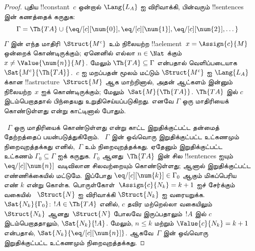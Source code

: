 \documentclass[../../../include/open-logic-section]{subfiles}
\begin{document}
\begin{proof}
புதிய !!{constant}~$c$ ஒன்றால் $\Lang{L_A}$ ஐ விரிவாக்கி,
பின்வரும் !!{sentence}s இன் கணத்தைக் கருதுக:
\[
\Gamma = \Th{TA} \cup \{\eq/[c][\num{0}], \eq/[c][\num{1}],
\eq/[c][\num{2}], \dots\}
\]
$\Gamma$ இன் எந்த மாதிரி~$\Struct{M^c}$ உம் நிலையற்ற
!!a{element}~$x =
\Assign{c}{M}$ ஒன்றைக் கொண்டிருக்கும்; ஏனெனில் எல்லா
$n \in \Nat$ க்கும் $x \neq
\Value{\num{n}}{M}$. மேலும் $\Th{TA} \subseteq \Gamma$ என்பதால்
வெளிப்படையாக $\Sat{M^c}{\Th{TA}}$.~$c$ ஐ மறப்பதன் மூலம் மட்டும்
$\Struct{M^c}$ ஐ $\Lang{L_A}$ க்கான !!a{structure}~$\Struct{M}$
ஆக மாற்றினால், அதன் ஆட்களம் இன்னும் நிலையற்ற~$x$ ஐக் கொண்டிருக்கும்;
மேலும்~$\Sat{M}{\Th{TA}}$. $\Th{TA}$ இல் $c$ இடம்பெறாததால் பிந்தையது
உறுதிசெய்யப்படுகிறது. எனவே $\Gamma$ ஒரு மாதிரியைக் கொண்டுள்ளது என்று
காட்டினால் போதும்.

~$\Gamma$ ஒரு மாதிரியைக் கொண்டுள்ளது என்று காட்ட இறுதிக்குட்பட்ட
தன்மைத் தேற்றத்தைப் பயன்படுத்துகிறோம். ~$\Gamma$ இன் ஒவ்வொரு
இறுதிக்குட்பட்ட உட்கணமும் நிறைவுறத்தக்கது எனில்,~$\Gamma$ உம்
நிறைவுறத்தக்கது. ஏதேனும் இறுதிக்குட்பட்ட உட்கணம்
$\Gamma_0 \subseteq
\Gamma$ ஐக் கருதுக. $\Gamma_0$ ஆனது~$\Th{TA}$ இன் சில
!!{sentence}s ஐயும்~$\eq/[c][\num{n}]$ வடிவிலான சிலவற்றையும்
கொண்டுள்ளது; ஆனால் இறுதிக்குட்பட்ட எண்ணிக்கையில் மட்டுமே. இப்போது
$\eq/[c][\num{k}] \in \Gamma_0$ ஆகும் மிகப்பெரிய எண் $k$ என்று கொள்க.
பொருள்கோள்~$\Assign{c}{N_k} = k+1$ ஐச் சேர்க்கும் வகையில்
~$\Struct{N}$ ஐ விரிவாக்கி $\Struct{N_k}$ ஐ வரையறுக்க.
$\Sat{N_k}{\Gamma_0}$: $!A
\in \Th{TA}$ எனில், $c$ தவிர மற்றெல்லா வகையிலும்
~$\Struct{N_k}$ ஆனது~$\Struct{N}$ போலவே இருப்பதாலும்~$!A$ இல் $c$
இடம்பெறாததாலும், $\Sat{N_k}{!A}$. மேலும், $n \le k$ மற்றும்
$\Value{c}{N_k} = k+1$ என்பதால்,
$\Sat{N_k}{\eq/[c][\num{n}]}$. ஆகவே~$\Gamma$ இன் ஒவ்வொரு
இறுதிக்குட்பட்ட உட்கணமும் நிறைவுறத்தக்கது.
\end{proof}
\end{document}
